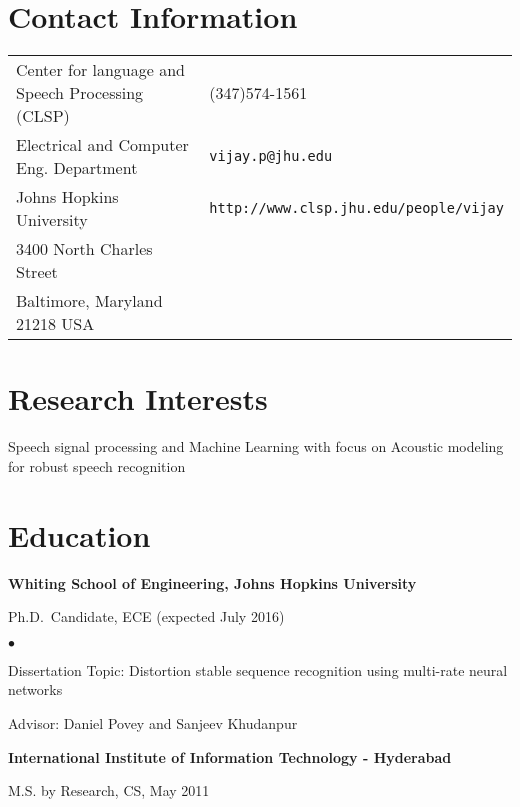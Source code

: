 \documentclass[margin,line,pifont,palatino,courier]{res}
\newenvironment{list1}{
  \begin{list}{\ding{113}}{%
      \setlength{\itemsep}{0in}
      \setlength{\parsep}{0in} \setlength{\parskip}{0in}
      \setlength{\topsep}{0in} \setlength{\partopsep}{0in}
      \setlength{\leftmargin}{0.17in}}}{\end{list}}
\newenvironment{list2}{
  \begin{list}{$\bullet$}{%
      \setlength{\itemsep}{0in}
      \setlength{\parsep}{0in} \setlength{\parskip}{0in}
      \setlength{\topsep}{0in} \setlength{\partopsep}{0in}
      \setlength{\leftmargin}{0.2in}}}{\end{list}}
\begin{document}

\begin{resume}

\section{\sc Contact Information}

\vspace{.05in}
\begin{tabular}{@{}p{2.75in}p{2in}}
Center for language and Speech Processing (CLSP) & (347)574-1561 \\
Electrical and Computer Eng. Department                        & \verb+vijay.p@jhu.edu+\\
Johns Hopkins University                  & \verb+http://www.clsp.jhu.edu/people/vijay+\\
3400 North Charles Street               & \\
Baltimore, Maryland 21218 USA               & \\
\end{tabular}

\section{\sc Research Interests}
Speech signal processing and Machine Learning with focus on Acoustic modeling for robust speech recognition
\section{\sc Education}

{\bf Whiting School of Engineering, Johns Hopkins University}\\
\vspace*{-.1in}
\begin{list1}
\item[] Ph.D.~Candidate, ECE (expected July 2016)

\begin{list2}
\vspace*{.05in}
\item Dissertation Topic:  Distortion stable sequence recognition using multi-rate neural networks
\item Advisor: Daniel Povey and Sanjeev Khudanpur
\end{list2}
\end{list1}

{\bf International Institute of Information Technology - Hyderabad}\\
\vspace*{-.1in}
\begin{list1}
\item[] M.S. by Research, CS, May 2011


\end{list1}
\end{resume}
\end{document}
